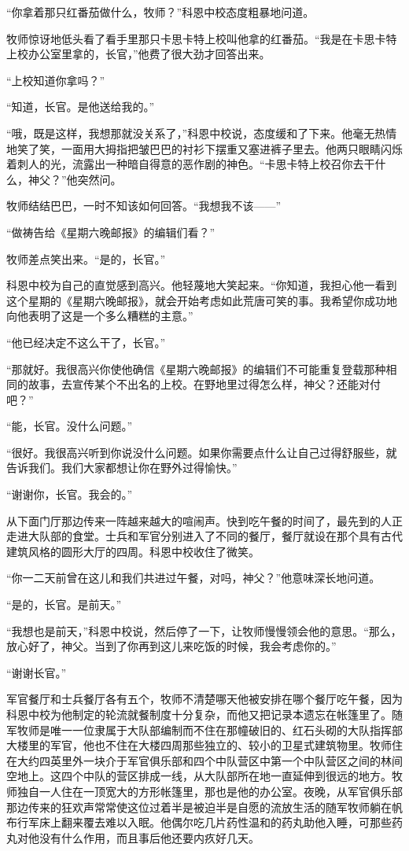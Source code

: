     “你拿着那只红番茄做什么，牧师？”科恩中校态度粗暴地问道。

    牧师惊讶地低头看了看手里那只卡思卡特上校叫他拿的红番茄。“我是在卡思卡特上校办公室里拿的，长官，”他费了很大劲才回答出来。

    “上校知道你拿吗？”

    “知道，长官。是他送给我的。”

    “哦，既是这样，我想那就没关系了，”科恩中校说，态度缓和了下来。他毫无热情地笑了笑，一面用大拇指把皱巴巴的衬衫下摆重又塞进裤子里去。他两只眼睛闪烁着刺人的光，流露出一种暗自得意的恶作剧的神色。“卡思卡特上校召你去干什么，神父？”他突然问。

    牧师结结巴巴，一时不知该如何回答。“我想我不该——”

    “做祷告给《星期六晚邮报》的编辑们看？”

    牧师差点笑出来。“是的，长官。”

    科恩中校为自己的直觉感到高兴。他轻蔑地大笑起来。“你知道，我担心他一看到这个星期的《星期六晚邮报》，就会开始考虑如此荒唐可笑的事。我希望你成功地向他表明了这是一个多么糟糕的主意。”

    “他已经决定不这么干了，长官。”

    “那就好。我很高兴你使他确信《星期六晚邮报》的编辑们不可能重复登载那种相同的故事，去宣传某个不出名的上校。在野地里过得怎么样，神父？还能对付吧？”

    “能，长官。没什么问题。”

    “很好。我很高兴听到你说没什么问题。如果你需要点什么让自己过得舒服些，就告诉我们。我们大家都想让你在野外过得愉快。”

    “谢谢你，长官。我会的。”

    从下面门厅那边传来一阵越来越大的喧闹声。快到吃午餐的时间了，最先到的人正走进大队部的食堂。士兵和军官分别进入了不同的餐厅，餐厅就设在那个具有古代建筑风格的圆形大厅的四周。科恩中校收住了微笑。

    “你一二天前曾在这儿和我们共进过午餐，对吗，神父？”他意味深长地问道。

    “是的，长官。是前天。”

    “我想也是前天，”科恩中校说，然后停了一下，让牧师慢慢领会他的意思。“那么，放心好了，神父。当到了你再到这儿来吃饭的时候，我会考虑你的。”

    “谢谢长官。”

    军官餐厅和士兵餐厅各有五个，牧师不清楚哪天他被安排在哪个餐厅吃午餐，因为科恩中校为他制定的轮流就餐制度十分复杂，而他又把记录本遗忘在帐篷里了。随军牧师是唯一一位隶属于大队部编制而不住在那幢破旧的、红石头砌的大队指挥部大楼里的军官，他也不住在大楼四周那些独立的、较小的卫星式建筑物里。牧师住在大约四英里外一块介于军官俱乐部和四个中队营区中第一个中队营区之间的林间空地上。这四个中队的营区排成一线，从大队部所在地一直延伸到很远的地方。牧师独自一人住在一顶宽大的方形帐篷里，那也是他的办公室。夜晚，从军官俱乐部那边传来的狂欢声常常使这位过着半是被迫半是自愿的流放生活的随军牧师躺在帆布行军床上翻来覆去难以入眠。他偶尔吃几片药性温和的药丸助他入睡，可那些药丸对他没有什么作用，而且事后他还要内疚好几天。

